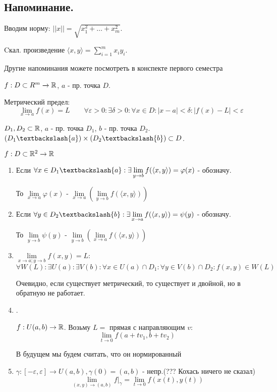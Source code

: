 \subsection{Напоминание.}

Вводим норму: $||x|| = \sqrt{x_1^2 + \ldots + x_m^2}$.

Cкал. произведение $\langle x,y\rangle = \sum\limits_{i=1}^mx_iy_i$.

Другие напоминания можете посмотреть в конспекте первого семестра

$f: D \subset R^m \xrightarrow{} \mathbb{R}$, $a$ - пр. точка $D$.

Метрический предел:
$$\lim\limits_{x\rightarrow a} f(x) = L \quad \quad \forall \varepsilon > 0:\exists \delta >0: \forall x \in D: |x-a|<\delta:|f(x)-L|<\varepsilon$$


 $D_1, D_2 \subset \mathbb{R}$, $a$ - пр. точка $D_1$, $b$ - пр. точка $D_2$. $(D_1 \textbackslash \{ a\})\times (D_2 \textbackslash \{ b\}) \subset D$.

$f:D \subset \mathbb{R}^2 \rightarrow \mathbb{R}$

\begin{enumerate}
    \item Если $\forall x \in D_1 \textbackslash \{a\}: \exists\lim\limits_{y\rightarrow b} f(\langle x,y \rangle) = \varphi(x)$ - обозначу. 
    
    То $\lim\limits_{x \rightarrow a }\varphi(x)$ -  $\lim\limits_{x\rightarrow a}(\lim\limits_{y\rightarrow b} f(\langle x,y \rangle))$

    \item Если $\forall y \in D_2 \textbackslash \{b\}: \exists\lim\limits_{x\rightarrow a} f(\langle x,y \rangle) = \psi(y)$ - обозначу. 
    
    То $\lim\limits_{y \rightarrow b }\psi(y)$ -  $\lim\limits_{y\rightarrow b}(\lim\limits_{x\rightarrow a} f(\langle x,y \rangle))$

    \item {} $\lim\limits_{x\rightarrow a; y\rightarrow b}f(x,y) = L$:
    $$\forall W(L): \exists U(a):\exists V(b): \forall x \in U(a)\cap D_1:\forall y \in V(b) \cap D_2: f(x,y) \in W(L)$$

    Очевидно, если существует метрический, то существует и двойной, но в обратную не работает.
    \item {}.
    
    $f: U(a,b) \rightarrow \mathbb{R}$. Возьму $L = $ прямая с направляющим $v$:
    $$\lim\limits_{t \rightarrow 0 } f(a + tv_1, b + tv_2)$$
    

    В будущем мы будем считать, что он нормированный

    \item {} 
    
    $\gamma: [-\varepsilon, \varepsilon] \rightarrow U(a,b), \gamma(0) =(a,b)$ - непр.(??? Кохась ничего не сказал) $$\lim\limits_{(x,y)\rightarrow(a,b)}f|_\gamma = \lim\limits_{t\rightarrow0}f(x(t),y(t))$$ 
    
\end{enumerate}


